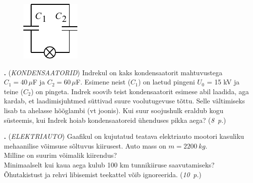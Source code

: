 \documentclass[11pt,a5paper]{article}
\newcommand{\numb}[1]{\vspace{5pt}\textbf{\large #1}}
\newcommand{\nimi}[1]{(\textsl{\small #1})}
\newcommand{\punktid}[1]{(\emph{#1~p.})}
\newcounter{ylesanne}
\newcommand{\yl}[1]{\addtocounter{ylesanne}{1}\numb{\theylesanne.} \nimi{#1} \newblock{}}
\newcommand{\autor}[1]{}%
\begin{document}
\begin{figure}
\vspace{-0.8cm}
  \begin{center}
    \includegraphics[width=1\linewidth]{kondekad_joonis.pdf}
  \end{center}
  \vspace{-0.9cm}
\end{figure}

\yl{KONDENSAATORID}
Indrekul on kaks kondensaatorit mahtuvustega $C_1=40\,\mu$F ja $C_2=60\,\mu$F. Esimene neist ($C_1$) on laetud pingeni $U_0$ = 15 kV ja teine ($C_2$) on pingeta. Indrek soovib teist kondensaatorit esimese abil laadida, aga kardab, et laadimisjuhtmed süttivad suure voolutugevuse tõttu. Selle vältimiseks lisab ta ahelasse hõõglambi (vt joonis). Kui suur soojushulk eraldub  kogu süsteemis, kui Indrek hoiab kondensaatoreid ühenduses pikka aega?
\punktid{8} \autor{Päivo Simson}





\yl{ELEKTRIAUTO}
Gaafikul on kujutatud teatava elektriauto mootori kasuliku mehaanilise võimsuse sõltuvus kiirusest. Auto mass on $m=\SI{2200}{kg}$.\\
\osa Milline on suurim võimalik kiirendus?\\
\osa Minimaalselt kui kaua aega kulub 100 km tunnikiiruse saavutamiseks?\\
Õhutakistust ja rehvi libisemist teekattel võib ignoreerida.
\punktid{10} \autor{VALTER KIISK}
\end{document}
